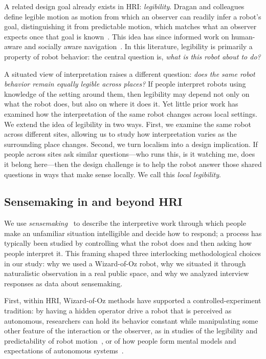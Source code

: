 A related design goal already exists in HRI: \emph{legibility}. Dragan and colleagues define legible motion as motion from which an observer can readily infer a robot's goal, distinguishing it from predictable motion, which matches what an observer expects once that goal is known~\cite{dragan2013legibility}. This idea has since informed work on human-aware and socially aware navigation~\cite{kruse2013human, singamaneni2024survey}. In this literature, legibility is primarily a property of robot behavior: the central question is, \emph{what is this robot about to do?}   

A situated view of interpretation raises a different question: \emph{does the same robot behavior remain equally legible across places?} If people interpret robots using knowledge of the setting around them, then legibility may depend not only on what the robot does, but also on where it does it. Yet little prior work has examined how the interpretation of the same robot changes across local settings. We extend the idea of legibility in two ways. First, we examine the same robot across different sites, allowing us to study how interpretation varies as the surrounding place changes. Second, we turn localism into a design implication. If people across sites ask similar questions---who runs this, is it watching me, does it belong here---then the design challenge is to help the robot answer those shared questions in ways that make sense locally. We call this \emph{local legibility}.

  \subsection{Sensemaking in and beyond HRI}
We use \textit{sensemaking}~\cite{weick2005organizing,pirolli2011introduction} to describe the interpretive work through which people make an unfamiliar situation intelligible and decide how to respond; a process has typically been studied by controlling what the robot does and then asking how people interpret it. This framing shaped three interlocking methodological choices in our study: why we used a Wizard-of-Oz robot, why we situated it through naturalistic observation in a real public space, and why we analyzed interview responses as data about sensemaking.

First, within HRI, Wizard-of-Oz methods have supported a controlled-experiment tradition: by having a hidden operator drive a robot that is perceived as autonomous, researchers can hold its behavior constant while manipulating some other feature of the interaction or the observer, as in studies of the legibility and predictability of robot motion~\cite{dragan2013legibility}, or of how people form mental models and expectations of autonomous systems~\cite{paepcke2010judging, riek2012wizard}. 

